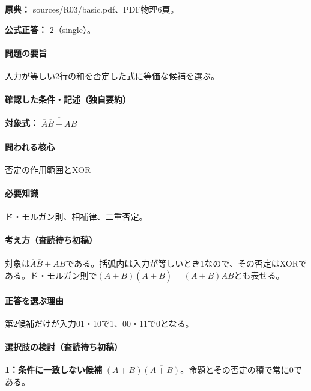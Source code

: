 \noindent\textbf{原典：} sources/R03/basic.pdf、PDF物理6頁。

\textbf{公式正答：} 2（single）。

\paragraph{問題の要旨} 入力が等しい2行の和を否定した式に等価な候補を選ぶ。

\paragraph{確認した条件・記述（独自要約）}\mbox{}\par

\noindent\textbf{対象式：} \(\overline{\overline A\overline B+AB}\)\par

\paragraph{問われる核心} 否定の作用範囲とXOR

\paragraph{必要知識} ド・モルガン則、相補律、二重否定。

\paragraph{考え方（査読待ち初稿）} 対象は\(\overline{\overline A\overline B+AB}\)である。括弧内は入力が等しいとき1なので、その否定はXORである。ド・モルガン則で\((A+B)(\overline A+\overline B)=(A+B)\overline{AB}\)とも表せる。

\paragraph{正答を選ぶ理由} 第2候補だけが入力01・10で1、00・11で0となる。

\paragraph{選択肢の検討（査読待ち初稿）}\mbox{}\par

\noindent\textbf{1：条件に一致しない候補} \((A+B)\overline{(A+B)}\)。命題とその否定の積で常に0である。\par

